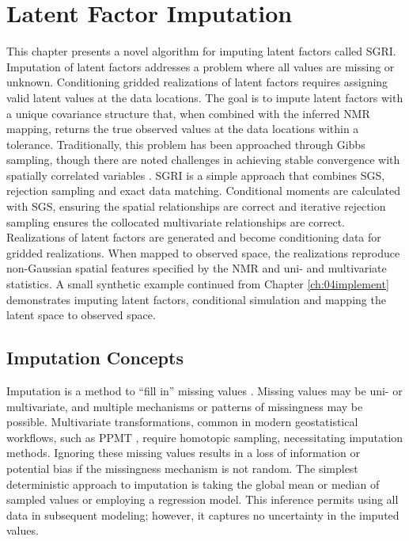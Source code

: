 
\chapter{Latent Factor Imputation}
\label{ch:05impute}

This chapter presents a novel algorithm for imputing latent factors called \gls{SGRI}. Imputation of latent factors addresses a problem where all values are missing or unknown. Conditioning gridded realizations of latent factors requires assigning valid latent values at the data locations. The goal is to impute latent factors with a unique covariance structure that, when combined with the inferred \gls{NMR} mapping, returns the true observed values at the data locations within a tolerance. Traditionally, this problem has been approached through Gibbs sampling, though there are noted challenges in achieving stable convergence with spatially correlated variables \citep{silva2018enhanced}. \gls{SGRI} is a simple approach that combines \gls{SGS}, rejection sampling and exact data matching. Conditional moments are calculated with \gls{SGS}, ensuring the spatial relationships are correct and iterative rejection sampling ensures the collocated multivariate relationships are correct. Realizations of latent factors are generated and become conditioning data for gridded realizations. When mapped to observed space, the realizations reproduce non-Gaussian spatial features specified by the \gls{NMR} and uni- and multivariate statistics. A small synthetic example continued from Chapter \ref{ch:04implement} demonstrates imputing latent factors, conditional simulation and mapping the latent space to observed space.

\FloatBarrier
\section{Imputation Concepts}
\label{sec:05imputation}

Imputation is a method to ``fill in'' missing values \citep{little2019statistical}. Missing values may be uni- or multivariate, and multiple mechanisms or patterns of missingness may be possible. Multivariate transformations, common in modern geostatistical workflows, such as \gls{PPMT} \citep{barnett2014projection}, require homotopic sampling, necessitating imputation methods. Ignoring these missing values results in a loss of information or potential bias if the missingness mechanism is not random. The simplest deterministic approach to imputation is taking the global mean or median of sampled values or employing a regression model. This inference permits using all data in subsequent modeling; however, it captures no uncertainty in the imputed values.

